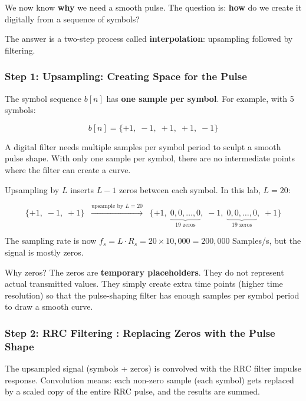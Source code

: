 We now know \textbf{why} we need a smooth pulse. The question is: \textbf{how} do we create it digitally from a sequence of symbols?

The answer is a two-step process called \textbf{interpolation}: upsampling followed by filtering.

\subsubsection{Step 1: Upsampling: Creating Space for the Pulse}

The symbol sequence $b[n]$ has \textbf{one sample per symbol}. For example, with 5 symbols:

\begin{equation}
b[n] = \{+1,\; -1,\; +1,\; +1,\; -1\}
\end{equation}

A digital filter needs multiple samples per symbol period to sculpt a smooth pulse shape. With only one sample per symbol, there are no intermediate points where the filter can create a curve.

Upsampling by $L$ inserts $L - 1$ zeros between each symbol. In this lab, $L = 20$:

\begin{equation}
\{+1,\; -1,\; +1\} \;\;\xrightarrow{\text{upsample by } L = 20}\;\; \{+1,\; \underbrace{0, 0, \ldots, 0}_{19 \text{ zeros}},\; -1,\; \underbrace{0, 0, \ldots, 0}_{19 \text{ zeros}},\; +1\}
\end{equation}

The sampling rate is now $f_s = L \cdot R_s = 20 \times 10{,}000 = 200{,}000$ Samples/s, but the signal is mostly zeros.

\begin{IntuitionBox}{Why zeros?}
The zeros are \textbf{temporary placeholders}. They do not represent actual transmitted values. They simply create extra time points (higher time resolution) so that the pulse-shaping filter has enough samples per symbol period to draw a smooth curve.
\end{IntuitionBox}

\subsubsection{Step 2: RRC Filtering : Replacing Zeros with the Pulse Shape}

The upsampled signal (symbols + zeros) is convolved with the RRC filter impulse response.
Convolution means: each non-zero sample (each symbol) gets replaced by a scaled copy of the entire RRC pulse, and the results are summed.

